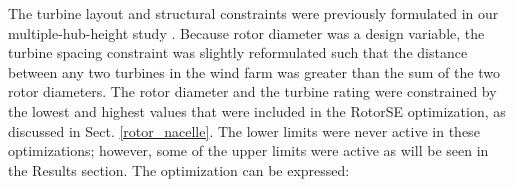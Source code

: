 \documentclass[WESD, manuscript]{copernicus}
\providecommand{\DIFdelbegin}{} %
\begin{document}
          The turbine layout and structural constraints were previously formulated in our multiple-hub-height study \citep{stanley2018}. Because rotor diameter was a design variable, the turbine spacing constraint was slightly reformulated such that the distance between any two turbines in the wind farm was greater than the sum of the two rotor diameters.
           The rotor diameter and the turbine rating were constrained by the lowest and highest values that were included in the RotorSE optimization, as discussed in Sect. \ref{rotor_nacelle}.
           The lower limits were never active in these optimizations; however, some of the upper limits were active as will be seen in the Results section.
       The optimization can be expressed:

        
        \begin{equation}
			\DIFdelbegin %

\end{equation}
\end{document}
